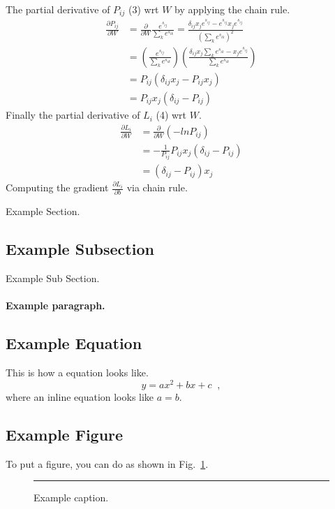 \documentclass[12pt, letter]{article}
\begin{document}
The partial derivative of $P_{ij}$ (3) wrt $W$ by applying the chain rule.
\begin{equation}\nonumber
\begin{split}
  \frac{\partial P_{ij}}{\partial W}& = \frac{\partial}{\partial W}\frac{e^{s_{ij}}}{\sum_ke^{s_{ik}}} = \frac{\delta_{ij}x_je^{s_{ij}}-e^{s_{ij}}x_je^{s_{ij}}}{\left(\sum_ke^{s_{ik}}\right)^2}\\
  & = \left(\frac{e^{s_{ij}}}{\sum_ke^{s_{ik}}}\right)\left(\frac{\delta_{ij}x_j\sum_ke^{s_{ik}}-x_je^{s_{ij}}}{\sum_ke^{s_{ik}}}\right)\\
  & = P_{ij} (\delta_{ij}x_j - P_{ij}x_j) \\
  & = P_{ij}x_j(\delta_{ij} - P_{ij})
\end{split}
\end{equation}
Finally the partial derivative of $L_i$ (4) wrt $W$.
\begin{equation}
\begin{split}
  \frac{\partial L_i}{\partial W}& = \frac{\partial}{\partial W}\left(-lnP_{ij}\right)\\
  & = -\frac{1}{P_{ij}} P_{ij}x_j(\delta_{ij} - P_{ij})\\
  & = (\delta_{ij} - P_{ij}) x_j
\end{split}
\end{equation}
Computing the gradient $\frac{\partial L_i}{\partial b}$ via chain rule.
\pagebreak

Example Section.

\subsection{Example Subsection}

Example Sub Section.

\paragraph{Example paragraph.}


\subsection{Example  Equation}

This is how a equation looks like.
\begin{equation}
  y = a x^2 + b x + c
  \;\;,
\end{equation}
where an inline equation looks like $a=b$.

\subsection{Example  Figure}

To put a figure, you can do as shown in Fig.~\ref{fig:eg}.
\begin{figure}
  \centering
  \rule{2cm}{2cm} %
  \caption{Example caption.}
  \label{fig:eg}
\end{figure}
\end{document}
